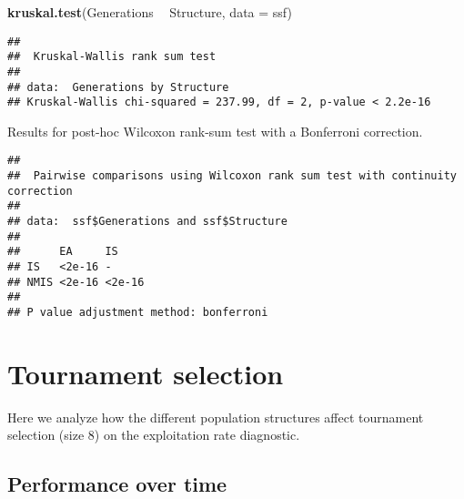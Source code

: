 \documentclass[]{book}
\newenvironment{Shaded}{\begin{snugshade}}{\end{snugshade}}
\newcommand{\DataTypeTok}[1]{\textcolor[rgb]{0.13,0.29,0.53}{#1}}
\newcommand{\KeywordTok}[1]{\textcolor[rgb]{0.13,0.29,0.53}{\textbf{#1}}}
\newcommand{\NormalTok}[1]{#1}
\newcommand{\OperatorTok}[1]{\textcolor[rgb]{0.81,0.36,0.00}{\textbf{#1}}}
\newcommand{\OtherTok}[1]{\textcolor[rgb]{0.56,0.35,0.01}{#1}}
\newcommand{\StringTok}[1]{\textcolor[rgb]{0.31,0.60,0.02}{#1}}
\begin{document}
\begin{Shaded}
\begin{Highlighting}[]
\KeywordTok{kruskal.test}\NormalTok{(Generations }\OperatorTok{~}\StringTok{ }\NormalTok{Structure, }\DataTypeTok{data =}\NormalTok{ ssf)}
\end{Highlighting}
\end{Shaded}

\begin{verbatim}
## 
##  Kruskal-Wallis rank sum test
## 
## data:  Generations by Structure
## Kruskal-Wallis chi-squared = 237.99, df = 2, p-value < 2.2e-16
\end{verbatim}

Results for post-hoc Wilcoxon rank-sum test with a Bonferroni correction.

\begin{Shaded}
\end{Shaded}

\begin{verbatim}
## 
##  Pairwise comparisons using Wilcoxon rank sum test with continuity correction 
## 
## data:  ssf$Generations and ssf$Structure 
## 
##      EA     IS    
## IS   <2e-16 -     
## NMIS <2e-16 <2e-16
## 
## P value adjustment method: bonferroni
\end{verbatim}

\hypertarget{tournament-selection}{%
\section{Tournament selection}\label{tournament-selection}}

Here we analyze how the different population structures affect tournament selection (size 8) on the exploitation rate diagnostic.

\hypertarget{performance-over-time-1}{%
\subsection{Performance over time}\label{performance-over-time-1}}
\end{document}
